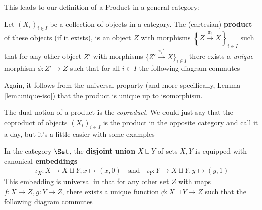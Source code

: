 This leads to our definition of a Product in a general category:

\begin{dfn}[]
  Let $(X_i)_{i \in I}$ be a collection of objects in a category. The (cartesian) \textbf{product} of these objects (if it exists), is an object $Z$ with morphisms 
  $\left\{Z \stackrel{\pi_i}{\to}X\right\}_{i \in I}$ 
  such that for any other object $Z'$ with morphisms
  $\big\{Z' \stackrel{\pi_i'}{\to}X\big\}_{i \in I}$ there exists a \emph{unique} morphism $\phi: Z' \to Z$ such that for all $i \in I$ the following diagram commutes
  \begin{center}
  \end{center}
\end{dfn}
Again, it follows from the universal proparty (and more specifically, Lemma \ref{lem:unique-iso}) that the product is unique up to isomorphism.

The dual notion of a product is the \emph{coproduct}. 
We could just say that the coproduct of objects $(X_i)_{i \in I}$ is the product in the opposite category and call it a day, but it's a little easier with some examples
\begin{ex}[Coproduct]
In the category $\Set$, the \textbf{disjoint union} $X \sqcup Y$ of sets $X,Y$ is equipped with canonical \textbf{embeddings}
\begin{align*}
  \iota_X: X \to X \sqcup Y, x \mapsto (x,0)
  \quad \text{and} \quad 
  \iota_Y: Y \to X \sqcup Y, y \mapsto (y,1)
\end{align*}
This embedding is universal in that for any other set $Z$ with maps $f: X \to Z, g: Y \to Z$, there exists a unique function $\phi: X \sqcup Y \to Z$ such that the following diagram commutes
  \begin{center}
  \end{center}
\end{ex}

